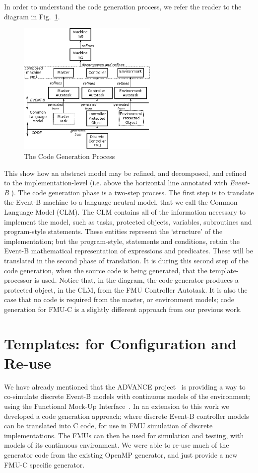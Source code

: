 \documentclass{llncs}%
\begin{document}
In order to understand the code generation process, we refer the reader to the diagram in Fig.~\ref{fig:CGProcess}.
%
\begin{figure}
\centering
\includegraphics[width=0.6\textwidth]{devel.png}
\caption{The Code Generation Process}
\label{fig:CGProcess}
\end{figure}
This show how an abstract model may be refined, and decomposed, and refined to the implementation-level (i.e. above the horizontal line annotated with \emph{Event-B} ). The code generation phase is a two-step process. The first step is to translate the Event-B machine to a language-neutral model, that we call the Common Language Model (CLM). The CLM contains all of the information necessary to implement the model, such as tasks, protected objects, variables, subroutines and program-style statements. These entities represent the `structure' of the implementation; but the program-style, statements and conditions, retain the Event-B mathematical representation of expressions and predicates. These will be translated in the second phase of translation. It is during this second step of the code generation, when the source code is being generated, that the template-processor is used. Notice that, in the diagram, the code generator produces a protected object, in the CLM, from the FMU Controller Autotask. It is also the case that no code is required from the master, or environment models; code generation for FMU-C is a slightly different approach from our previous work.

\section{Templates: for Configuration and Re-use}\label{templates}
%
We have already mentioned that the ADVANCE project~\cite{advance} is providing a way to co-simulate discrete Event-B models with continuous models of the environment; using the Functional Mock-Up Interface~\cite{FMISTD}. In an extension to this work we developed a code generation approach; where discrete Event-B controller models can be translated into C code, for use in FMU simulation of discrete implementations. The FMUs can then be used for simulation and testing, with models of its continuous environment. We were able to re-use much of the generator code from the existing OpenMP generator, and just provide a new FMU-C specific generator.  
\end{document}
